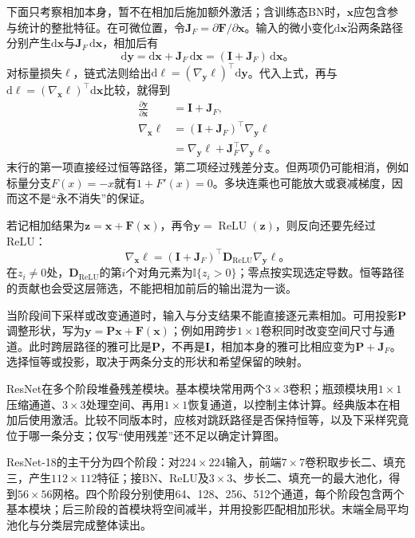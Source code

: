 下面只考察相加本身，暂不在相加后施加额外激活；含训练态BN时，$\bm x$应包含参与统计的整批特征。在可微位置，令$\bm J_F=\partial\bm F/\partial\bm x$。输入的微小变化$\mathrm d\bm x$沿两条路径分别产生$\mathrm d\bm x$与$\bm J_F\,\mathrm d\bm x$，相加后有
\[
  \mathrm d\bm y=\mathrm d\bm x+\bm J_F\,\mathrm d\bm x
    =(\bm I+\bm J_F)\,\mathrm d\bm x\text{。}
\]
对标量损失$\ell$，链式法则给出$\mathrm d\ell=(\nabla_{\bm y}\ell)^\top\mathrm d\bm y$。代入上式，再与$\mathrm d\ell=(\nabla_{\bm x}\ell)^\top\mathrm d\bm x$比较，就得到
\begin{equation}
  \begin{aligned}
    \frac{\partial\bm y}{\partial\bm x}&=\bm I+\bm J_F,\\
    \nabla_{\bm x}\ell&=(\bm I+\bm J_F)^\top\nabla_{\bm y}\ell\\
      &=\nabla_{\bm y}\ell+\bm J_F^\top\nabla_{\bm y}\ell\text{。}
  \end{aligned}
  \label{eq:cnn-residual-gradient}
\end{equation}
末行的第一项直接经过恒等路径，第二项经过残差分支。但两项仍可能相消，例如标量分支$F(x)=-x$就有$1+F'(x)=0$。多块连乘也可能放大或衰减梯度，因而这不是“永不消失”的保证。

若记相加结果为$\bm z=\bm x+\bm F(\bm x)$，再令$\bm y=\operatorname{ReLU}(\bm z)$，则反向还要先经过ReLU：
\[
  \nabla_{\bm x}\ell
    =(\bm I+\bm J_F)^\top\bm D_{\mathrm{ReLU}}\nabla_{\bm y}\ell\text{。}
\]
在$z_i\neq0$处，$\bm D_{\mathrm{ReLU}}$的第$i$个对角元素为$\mathbb I\{z_i>0\}$；零点按实现选定导数。恒等路径的贡献也会受这层筛选，不能把相加前后的输出混为一谈。

当阶段间下采样或改变通道时，输入与分支结果不能直接逐元素相加。可用投影$\bm P$调整形状，写为$\bm y=\bm P\bm x+\bm F(\bm x)$；例如用跨步$1\times1$卷积同时改变空间尺寸与通道。此时跨层路径的雅可比是$\bm P$，不再是$\bm I$，相加本身的雅可比相应变为$\bm P+\bm J_F$。选择恒等或投影，取决于两条分支的形状和希望保留的映射。

ResNet在多个阶段堆叠残差模块。基本模块常用两个$3\times3$卷积；瓶颈模块用$1\times1$压缩通道、$3\times3$处理空间、再用$1\times1$恢复通道，以控制主体计算。经典版本在相加后使用激活。比较不同版本时，应核对跳跃路径是否保持恒等，以及下采样究竟位于哪一条分支；仅写“使用残差”还不足以确定计算图。

ResNet-18的主干分为四个阶段：对$224\times224$输入，前端$7\times7$卷积取步长二、填充三，产生$112\times112$特征；接BN、ReLU及$3\times3$、步长二、填充一的最大池化，得到$56\times56$网格。四个阶段分别使用64、128、256、512个通道，每个阶段包含两个基本模块；后三阶段的首模块将空间减半，并用投影匹配相加形状。末端全局平均池化与分类层完成整体读出。

